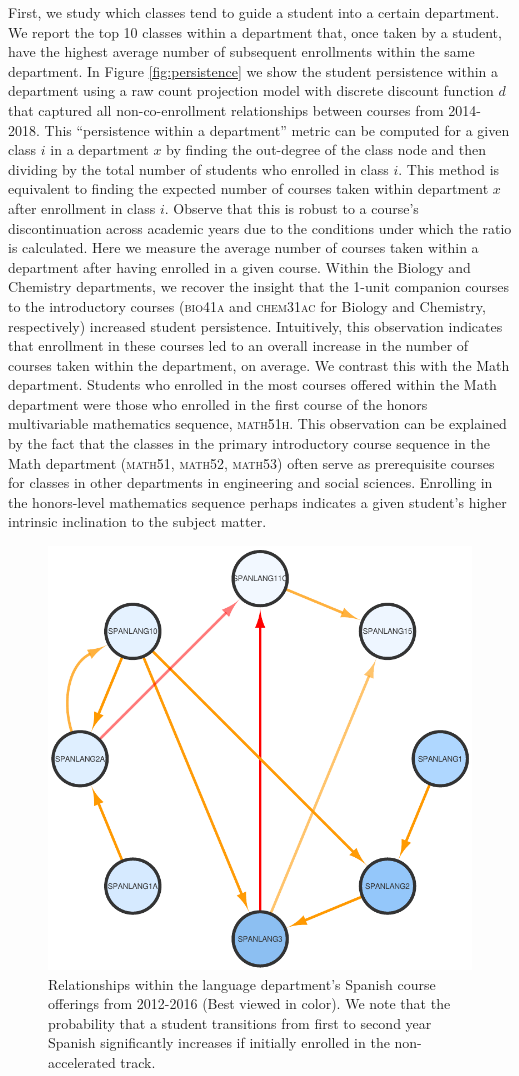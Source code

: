 \documentclass{sigchi}
\begin{document}
First, we study which classes tend to guide a student into a certain
department. We report the top 10 classes within a department that,
once taken by a student, have the highest average number of subsequent
enrollments within the same department. In Figure
\ref{fig:persistence} we show the student persistence within a
department using a raw count projection model with discrete discount
function $d$ that captured all non-co-enrollment relationships between
courses from 2014-2018.  This ``persistence within a department'' metric can be computed for a given class $i$ in a department $x$ by finding the out-degree of the class node and then dividing by the total number of students who enrolled in class $i$. This method is equivalent to finding the expected number of courses taken within department $x$ after enrollment in class $i$. Observe that this is robust to a course's discontinuation across academic years due to the conditions under which the ratio is calculated. Here we measure the
average number of courses taken within a department after having
enrolled in a given course. Within the Biology and Chemistry
departments, we recover the insight that the 1-unit companion courses
to the introductory courses (\textsc{bio41a} and \textsc{chem31ac} for Biology and
Chemistry, respectively) increased student persistence. Intuitively,
this observation indicates that enrollment in these courses led to an
overall increase in the number of courses taken within the department,
on average. We contrast this with the Math department. Students who
enrolled in the most courses offered within the Math department were
those who enrolled in the first course of the honors multivariable
mathematics sequence, \textsc{math51h}. This observation can be explained by the fact that the classes in the primary introductory course sequence in the Math department (\textsc{math51}, \textsc{math52}, \textsc{math53}) often serve as prerequisite courses for classes in other departments in engineering and social sciences. Enrolling in the honors-level mathematics sequence perhaps indicates a given student's higher intrinsic inclination to the subject matter.
\begin{figure}[h]
    \centering
    \includegraphics[width=0.4\columnwidth]{final-spanlang.pdf}  
    \caption{Relationships within the language department's Spanish course offerings from 2012-2016 (Best viewed in color). We note that the probability that a student transitions from first to second year Spanish significantly increases if initially enrolled in the non-accelerated track.}
    \label{fig:spanlang}
\end{figure}
\end{document}
